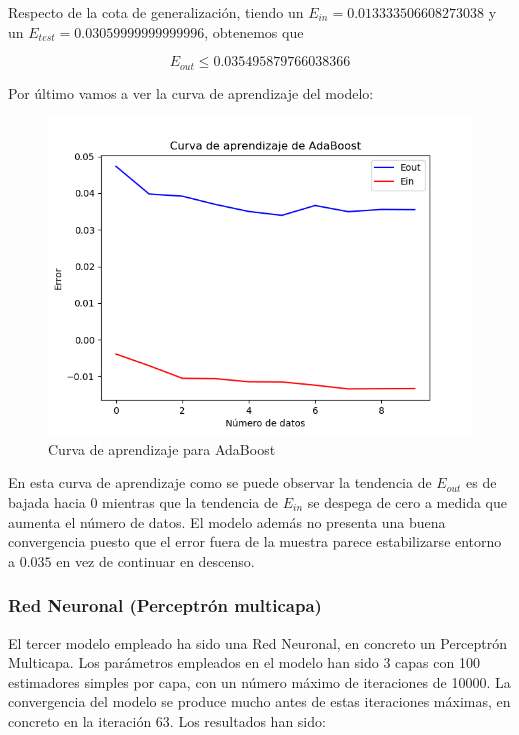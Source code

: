 Respecto de la cota de generalización, tiendo un $E_{in}= 0.013333506608273038$ y un $E_{test} = 0.03059999999999996$, obtenemos que

$$E_{out} \leq 0.035495879766038366$$

Por último vamos a ver la curva de aprendizaje del modelo:

\begin{figure}[H] %
	\centering
	\includegraphics[scale=0.6]{aprendizaje-adaboost.png}  %
	\caption{Curva de aprendizaje para AdaBoost} 
	\label{fig:aprendizaje-adaboost}
\end{figure}

En esta curva de aprendizaje como se puede observar la tendencia de $E_{out}$ es de bajada hacia 0 mientras que la tendencia de $E_{in}$ se despega de cero a medida que aumenta el número de datos. El modelo además no presenta una buena convergencia puesto que el error fuera de la muestra parece estabilizarse entorno a $0.035$ en vez de continuar en descenso.

\subsubsection{Red Neuronal (Perceptrón multicapa)}

El tercer modelo empleado ha sido una Red Neuronal, en concreto un Perceptrón Multicapa. Los parámetros empleados en el modelo han sido 3 capas con 100 estimadores simples por capa, con un número máximo de iteraciones de 10000. La convergencia del modelo se produce mucho antes de estas iteraciones máximas, en concreto en la iteración 63. Los resultados han sido:

